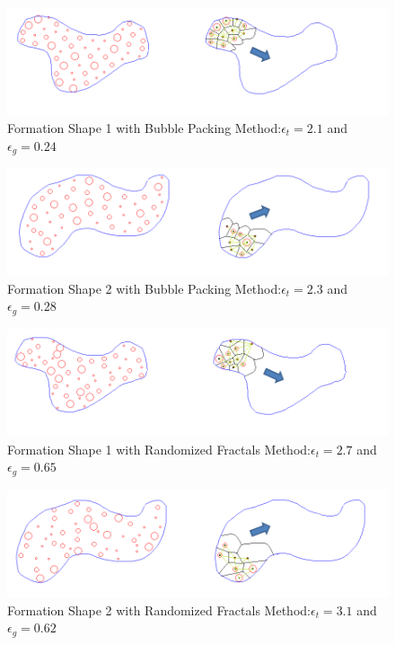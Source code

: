 				\begin{figure}[H]
					\caption{Formation Shape 1 with Bubble Packing Method:$\epsilon_t = 2.1$ and $\epsilon_g = 0.24$}
					\centerline{\includegraphics[scale = 0.70]{Bubble_Packing_Mesh_1}}
				\end{figure} 	
						\begin{figure}[H]
							\caption{Formation Shape 2 with Bubble Packing Method:$\epsilon_t = 2.3$ and $\epsilon_g = 0.28$}
							\centerline{\includegraphics[scale = 0.65]{Bubble_Packing_Mesh_2}}
						\end{figure} 			
						\begin{figure}[H]
							\caption{Formation Shape 1 with Randomized Fractals Method:$\epsilon_t = 2.7$ and $\epsilon_g = 0.65$}
							\centerline{\includegraphics[scale = 0.70]{Randomized_Fractals_Mesh_1}}
						\end{figure} 	
						\begin{figure}[H]
							\caption{Formation Shape 2 with Randomized Fractals Method:$\epsilon_t = 3.1$ and $\epsilon_g = 0.62$}
							\centerline{\includegraphics[scale = 0.65]{Randomized_Fractals_Mesh_2}}
						\end{figure} 	
